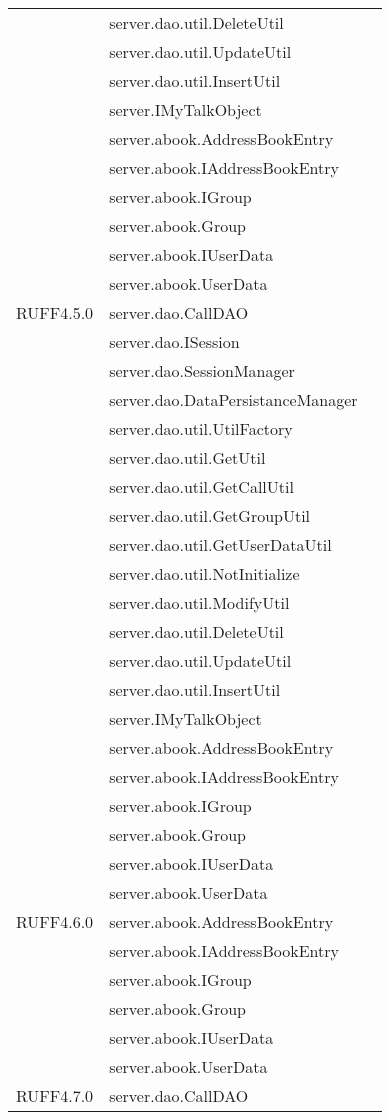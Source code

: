 \begin{center}
\begin{longtable}{lp{}l}
& server.dao.util.DeleteUtil\\
& server.dao.util.UpdateUtil\\
& server.dao.util.InsertUtil\\
& server.IMyTalkObject\\
& server.abook.AddressBookEntry\\
& server.abook.IAddressBookEntry\\
& server.abook.IGroup\\
& server.abook.Group\\
& server.abook.IUserData\\
& server.abook.UserData\\
RUFF4.5.0 & server.dao.CallDAO\\
& server.dao.ISession\\
& server.dao.SessionManager\\
& server.dao.DataPersistanceManager\\
& server.dao.util.UtilFactory\\
& server.dao.util.GetUtil\\
& server.dao.util.GetCallUtil\\
& server.dao.util.GetGroupUtil\\
& server.dao.util.GetUserDataUtil\\
& server.dao.util.NotInitialize\\
& server.dao.util.ModifyUtil\\
& server.dao.util.DeleteUtil\\
& server.dao.util.UpdateUtil\\
& server.dao.util.InsertUtil\\
& server.IMyTalkObject\\
& server.abook.AddressBookEntry\\
& server.abook.IAddressBookEntry\\
& server.abook.IGroup\\
& server.abook.Group\\
& server.abook.IUserData\\
& server.abook.UserData\\
RUFF4.6.0 & server.abook.AddressBookEntry\\
& server.abook.IAddressBookEntry\\
& server.abook.IGroup\\
& server.abook.Group\\
& server.abook.IUserData\\
& server.abook.UserData\\
RUFF4.7.0 & server.dao.CallDAO\\

\end{longtable}
\end{center}
